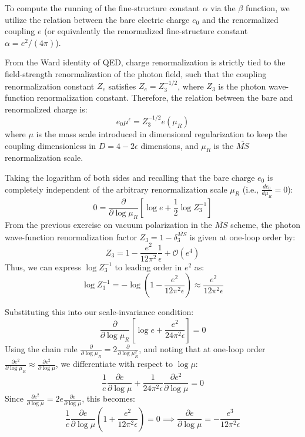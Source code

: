 To compute the running of the fine-structure constant $\alpha$ via the $\beta$ function, we utilize the relation between the bare electric charge $e_0$ and the renormalized coupling $e$ (or equivalently the renormalized fine-structure constant $\alpha = e^2 / (4\pi)$).

From the Ward identity of QED, charge renormalization is strictly tied to the field-strength renormalization of the photon field, such that the coupling renormalization constant $Z_e$ satisfies $Z_e = Z_3^{-1/2}$, where $Z_3$ is the photon wave-function renormalization constant. Therefore, the relation between the bare and renormalized charge is:
\[
    e_0 \mu^\epsilon = Z_3^{-1/2} e(\mu_R)
\]
where $\mu$ is the mass scale introduced in dimensional regularization to keep the coupling dimensionless in $D = 4-2\epsilon$ dimensions, and $\mu_R$ is the $\overline{MS}$ renormalization scale.

Taking the logarithm of both sides and recalling that the bare charge $e_0$ is completely independent of the arbitrary renormalization scale $\mu_R$ (i.e., $\frac{d e_0}{d \mu_R} = 0$):
\[
    0 = \frac{\partial}{\partial \log \mu_R} \left[ \log e + \frac{1}{2} \log Z_3^{-1} \right]
\]
From the previous exercise on vacuum polarization in the $\overline{MS}$ scheme, the photon wave-function renormalization factor $Z_3 = 1 - \delta_3^{\overline{MS}}$ is given at one-loop order by:
\[
    Z_3 = 1 - \frac{e^2}{12\pi^2} \frac{1}{\epsilon} + \mathcal{O}(e^4)
\]
Thus, we can express $\log Z_3^{-1}$ to leading order in $e^2$ as:
\[
    \log Z_3^{-1} = -\log \left( 1 - \frac{e^2}{12\pi^2 \epsilon} \right) \approx \frac{e^2}{12\pi^2 \epsilon}
\]

Substituting this into our scale-invariance condition:
\[
    \frac{\partial}{\partial \log \mu_R} \left[ \log e + \frac{e^2}{24\pi^2 \epsilon} \right] = 0
\]
Using the chain rule $\frac{\partial}{\partial \log \mu_R} = 2 \frac{\partial}{\partial \log \mu_R^2}$, and noting that at one-loop order $\frac{\partial e^2}{\partial \log \mu_R} \approx \frac{\partial e^2}{\partial \log \mu}$, we differentiate with respect to $\log \mu$:
\[
    \frac{1}{e} \frac{\partial e}{\partial \log \mu} + \frac{1}{24\pi^2 \epsilon} \frac{\partial e^2}{\partial \log \mu} = 0
\]
Since $\frac{\partial e^2}{\partial \log \mu} = 2e \frac{\partial e}{\partial \log \mu}$, this becomes:
\[
    \frac{1}{e} \frac{\partial e}{\partial \log \mu} \left( 1 + \frac{e^2}{12\pi^2 \epsilon} \right) = 0 \implies \frac{\partial e}{\partial \log \mu} = -\frac{e^3}{12\pi^2 \epsilon}
\]


